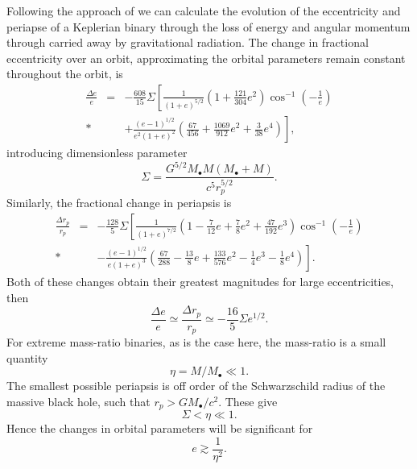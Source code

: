 \documentclass[useAMS,usedcolumn,usegraphicx,usenatbib]{mn2e}
\newcommand{\recip}[1]{\ensuremath{\frac{1}{#1}}}
\begin{document}
Following the approach of \citet{Turner1977} we can calculate the evolution of the eccentricity and periapse of a Keplerian binary through the loss of energy and angular momentum through carried away by gravitational radiation. The change in fractional eccentricity over an orbit, approximating the orbital parameters remain constant throughout the orbit, is
\begin{eqnarray}
\frac{\Delta e}{e} & = & -\frac{608}{15}\Sigma\left[\recip{(1+e)^{5/2}}\left(1 + \frac{121}{304}e^2\right)\cos^{-1}\left(-\recip{e}\right)\right. \nonumber\\*
 & & \left. + \frac{(e - 1)^{1/2}}{e^2(1+e)^2}\left(\frac{67}{456} + \frac{1069}{912}e^2 + \frac{3}{38}e^4\right)\right],
\end{eqnarray}
introducing dimensionless parameter
\begin{equation}
\Sigma = \frac{G^{5/2}M_\bullet M(M_\bullet+ M)}{c^5r_p^{5/2}}.
\end{equation}
Similarly, the fractional change in periapsis is
\begin{eqnarray}
\frac{\Delta r_p}{r_p} & = & -\frac{128}{5}\Sigma\left[\recip{(1+e)^{7/2}}\left(1 - \frac{7}{12}e + \frac{7}{8}e^2 + \frac{47}{192}e^3\right)\cos^{-1}\left(-\recip{e}\right)\right. \nonumber \\*
 & & \left. - \frac{(e - 1)^{1/2}}{e(1 + e)^3}\left(\frac{67}{288} - \frac{13}{8}e + \frac{133}{576}e^2 - \frac{1}{4}e^3 - \frac{1}{8}e^4\right)\right].
\end{eqnarray}
Both of these changes obtain their greatest magnitudes for large eccentricities, then
\begin{equation}
\frac{\Delta e}{e} \simeq \frac{\Delta r_p}{r_p} \simeq -\frac{16}{5}\Sigma e^{1/2}.
\end{equation}
For extreme mass-ratio binaries, as is the case here, the mass-ratio is a small quantity
\begin{equation}
\eta = M/M_\bullet \ll 1.
\end{equation}
The smallest possible periapsis is off order of the Schwarzschild radius of the massive black hole, such that $r_p > GM_\bullet/c^2$. These give
\begin{equation}
\Sigma < \eta \ll 1.
\end{equation}
Hence the changes in orbital parameters will be significant for
\begin{equation}
e \gtrsim \recip{\eta^2}.
\end{equation}

\bsp

\label{lastpage}
\end{document}
